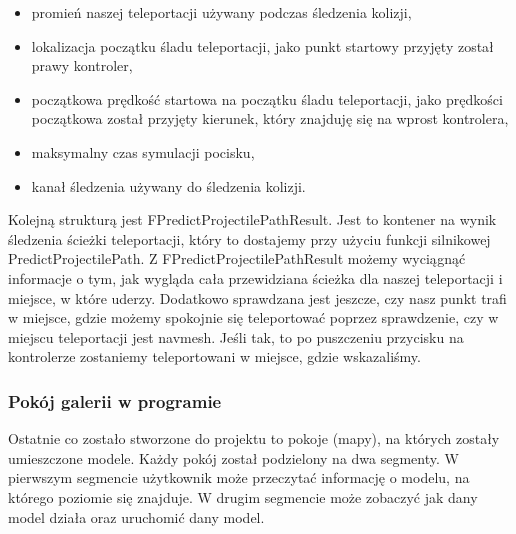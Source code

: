 \documentclass[a4paper,12pt,reqno]{article}
\begin{document}
\begin{itemize}
\item promień naszej teleportacji używany podczas śledzenia kolizji,
\item lokalizacja początku śladu teleportacji, jako punkt startowy przyjęty został prawy kontroler,
\item początkowa prędkość startowa na początku śladu teleportacji, jako prędkości początkowa został przyjęty kierunek, który znajduję się na wprost kontrolera,
\item maksymalny czas symulacji pocisku,
\item kanał śledzenia używany do śledzenia kolizji.
\end{itemize}

Kolejną strukturą jest FPredictProjectilePathResult. Jest to kontener na wynik śledzenia ścieżki teleportacji, który to dostajemy przy użyciu funkcji silnikowej PredictProjectilePath. Z FPredictProjectilePathResult możemy wyciągnąć informacje o tym, jak wygląda cała przewidziana ścieżka dla naszej teleportacji i miejsce, w które uderzy. Dodatkowo sprawdzana jest jeszcze, czy nasz punkt trafi w miejsce, gdzie możemy spokojnie się teleportować poprzez sprawdzenie, czy w miejscu teleportacji jest navmesh. Jeśli tak, to po puszczeniu przycisku na kontrolerze zostaniemy teleportowani w miejsce, gdzie wskazaliśmy.



\subsubsection{Pokój galerii w programie}

Ostatnie co zostało stworzone do projektu to pokoje (mapy), na których zostały umieszczone modele. Każdy pokój został podzielony na dwa segmenty. W pierwszym segmencie użytkownik może przeczytać informację o modelu, na którego poziomie się znajduje. W drugim segmencie może zobaczyć jak dany model działa oraz uruchomić dany model.
\end{document}
